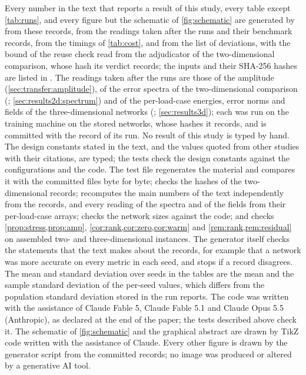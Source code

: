 Every number in the text that reports a result of this study, every table except
\cref{tab:runs}, and every figure but the schematic of \cref{fig:schematic} are generated
by  from these records, from the readings taken after
the runs and their benchmark records, from the timings of \cref{tab:cost}, and from the
list of deviations, with the bound of the
reuse check read from the adjudicator of the two-dimensional comparison, whose hash its
verdict records; the inputs and their SHA-256 hashes are listed in
. The readings taken after the runs are those of
the amplitude (\cref{sec:transfer:amplitude}), of the error spectra of the two-dimensional
comparison (; \cref{sec:results2d:spectrum}) and of the
per-load-case energies, error norms and fields of the three-dimensional networks
(; \cref{sec:results3d}); each was run on the training
machine on the stored networks, whose hashes it records, and is committed with the record
of its run. No result of this study is typed by hand. The design constants stated in the
text, and the values quoted from other studies with their citations, are typed; the tests
check the design constants against the configurations and the code. The test file
 regenerates the material and compares it with the
committed files byte for byte; checks the hashes of the two-dimensional records; recomputes
the main numbers of the text independently from the records, and every reading of the
spectra and of the fields from their per-load-case arrays; checks the network sizes against
the code; and checks \cref{prop:stress,prop:amp}, \cref{cor:rank,cor:zero,cor:warm} and
\cref{rem:rank,rem:residual} on assembled two- and three-dimensional instances. The
generator itself checks the statements that the text makes about the records, for example
that a network was more accurate on every metric in each seed, and stops if a record
disagrees. The mean and standard deviation over seeds in the tables are the mean and the
sample standard deviation of the per-seed values, which differs from the population
standard deviation stored in the run reports. The code was written with the assistance of
Claude Fable 5, Claude Fable 5.1 and Claude Opus 5.5 (Anthropic), as declared at the end of
the paper; the tests described above check it. The schematic of \cref{fig:schematic} and the
graphical abstract are drawn by TikZ code written with the assistance of Claude. Every other
figure is drawn by the generator script from the committed records; no image was produced
or altered by a generative AI tool.

